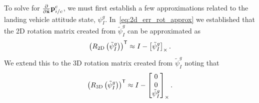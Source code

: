 To solve for $\frac{\partial}{\partial \tilde{\mathrm{\mathbf{x}}}} \mathrm{\mathbf{p}}_{i/c}^c$, we must
first establish a few approximations related to the landing vehicle attitude
state, $\psi_I^g$. In~\eqref{eq:2d_err_rot_approx} we established that the 2D
rotation matrix created from $\tilde{\psi}_I^g$ can be approximated as
\begin{equation}
  \left( R_{\text{2D}} \left( \tilde{\psi}_I^g \right) \right)^{\mathsf{T}} \approx I -
  \left[ \tilde{\psi}_I^g \right]_{\times}.
\end{equation}
We extend this to the 3D rotation matrix created from $\tilde{\psi}_I^g$ noting
that
\begin{equation}
  \left( R_{\text{3D}} \left( \tilde{\psi}_I^g \right) \right)^{\mathsf{T}} \approx I -
  \left[ 
    \begin{matrix}
  0 \\ 0 \\ \tilde{\psi}_I^g  \end{matrix}
   \right]_{\times}.
  \label{eq:3d_psi_rot_approx}
\end{equation}

